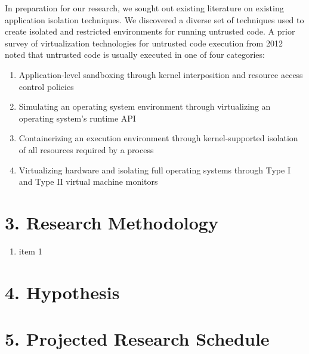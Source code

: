\documentclass{proc}
\begin{document}
In preparation for our research, we sought out existing literature on existing application isolation techniques. We discovered a diverse set of techniques used to create isolated and restricted environments for running untrusted code.
\newline\newline
A prior survey of virtualization technologies for untrusted code execution from 2012 \cite{wen2012survey} noted that untrusted code is usually executed in one of four categories:
\begin{enumerate}
    \item Application-level sandboxing through kernel interposition and resource access control policies
    \item Simulating an operating system environment through virtualizing an operating system's runtime API
    \item Containerizing an execution environment through kernel-supported isolation of all resources required by a process
    \item Virtualizing hardware and isolating full operating systems through Type I and Type II virtual machine monitors
\end{enumerate}

\section*{3. Research Methodology}

\begin{enumerate}
\item item 1
\end{enumerate}

\section*{4. Hypothesis}

\section*{5. Projected Research Schedule}






\end{document}
